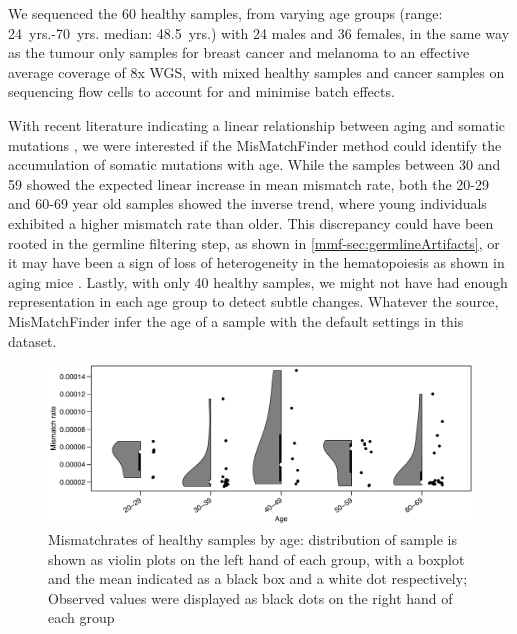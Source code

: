 We sequenced the 60 healthy samples, from varying age groups (range: \num{24}~yrs.-\num{70}~yrs. median: \num{48.5}~yrs.) with 24 males and 36 females, in the  same way as the tumour only samples for breast cancer and melanoma to an effective average coverage of 8x WGS, with mixed healthy samples and cancer samples on sequencing flow cells to account for and minimise batch effects.

With recent literature indicating a linear relationship between aging and somatic mutations \cite{Martincorena2018,Abascal2021,Cagan2022}, we were interested if the MisMatchFinder method could identify the accumulation of  somatic mutations with age. While the samples between 30 and 59 showed the expected linear increase in mean mismatch rate, both the 20-29 and 60-69 year old samples showed the inverse trend, where young individuals exhibited a higher mismatch rate than older. This discrepancy could have been rooted in the germline filtering step, as shown in \autoref{mmf-sec:germlineArtifacts}, or it may have been a sign of loss of heterogeneity in the hematopoiesis as shown in aging mice \cite{Ganuza2019}. Lastly, with only 40 healthy samples, we might not have had enough representation in each age group to detect subtle changes. Whatever the source, MisMatchFinder  infer the age of a sample with the default settings in this dataset.

\begin{figure}[ht]
\centering
\includegraphics[width=.99\linewidth]{Figures/MisMatchFinder/MisMatchRateByAge.pdf}
\caption[Mismatchrates of healthy samples by age]{Mismatchrates of healthy samples by age: distribution of sample is shown as violin plots on the left hand of each group, with a boxplot and the mean indicated as a black box and a white dot respectively; Observed values were displayed as black dots on the right hand of each group}\label{fig:mmf-mmrByAge}
\end{figure}


